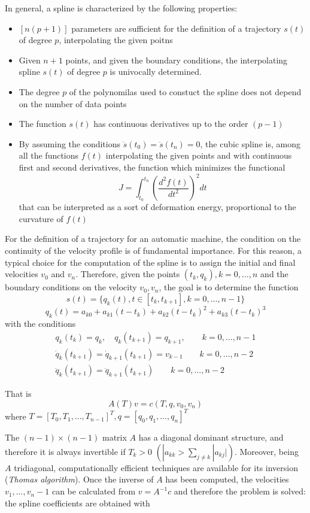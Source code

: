 \documentclass{book}
\begin{document}
In general, a spline is characterized by the following properties: 
\begin{itemize}
  \item $[n(p+1)]$ parameters are sufficient for the definition of a trajectory $s(t)$ of degree $p$, interpolating the given poitns 
  \item Given $n+1$ points, and given the boundary conditions, the interpolating spline $s(t)$ of degree $p$ is univocally determined. 
  \item The degree $p$ of the polynomilas used to constuct the spline does not depend on the number of data points 
  \item The function $s(t)$ has continuous derivatives up to the order $(p-1)$
  \item By assuming the conditions $\ddot{s}(t_0)=\ddot{s}(t_n)=0$, the cubic spline is, among all the functions $f(t)$ interpolating the given points and with continuous first and second derivatives, the function which minimizes the functional 
    \[
      J=\displaystyle\int_{t_0}^{t_n}\left(\displaystyle\frac{d^2f(t)}{dt^2}\right)^2 dt
    \]
    that can be interpreted as a sort of deformation energy, proportional to the curvature of $f(t)$
\end{itemize}

For the definition of a trajectory for an automatic machine, the condition on the continuity of the velocity profile is of fundamental importance. For this reason, a typical choice for the computation of the spline is to assign the initial and final velocities $v_0$ and $v_n$. Therefore, given the points $(t_k,q_k),k=0,\dots,n$ and the boundary conditions on the velocity $v_0,v_n$, the goal is to determine the function 
\[
  s(t) = \{q_k(t), t\in[t_k,t_{k+1}],k=0,\dots,n-1\}
\]
\[
  q_k(t)=a_{k0}+a_{k1}(t-t_k)+a_{k2}(t-t_k)^2+a_{k3}(t-t_k)^3
\]
with the conditions 
\begin{gather*}
  q_k(t_k)=q_k,\quad q_k(t_{k+1})=q_{k+1}, \qquad k=0,\dots,n-1\\
  \dot{q}_k(t_{k+1})=\dot{q}_{k+1}(t_{k+1})=v_{k-1} \qquad k=0,\dots,n-2\\
  \ddot{q}_k(t_{k+1})=\ddot{q}_{k+1}(t_{k+1}) \qquad k=0,\dots,n-2
\end{gather*}

That is 
\[
  A(T)v=c(T,q,v_0,v_n)
\]
where $T=[T_0,T_1,\dots,T_{n-1}]^T,q=[q_0,q_1,\dots,q_n]^T$ 

The $(n-1)\times(n-1)$ matrix $A$ has a diagonal dominant structure, and therefore it is always invertible if $T_k>0$ $(|a_{kk}>\sum_{j\neq k}|a_{kj}|)$. 
Moreover, being $A$ tridiagonal, computationally efficient techniques are available for its inversion (\emph{Thomas algorithm}).
Once the inverse of $A$ has been computed, the velocities $v_1,\dots,v_n-1$ can be calculated from $v=A^{-1}c$ and therefore the problem is solved: the spline coefficients are obtained with %
\end{document}
